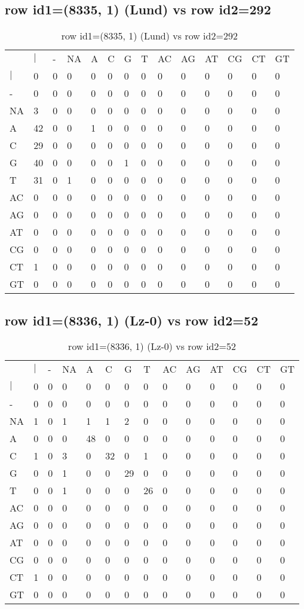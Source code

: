 \subsection{row id1=(8335, 1) (Lund) vs row id2=292}
\begin{center}
\begin{longtable}{|l|l|l|l|l|l|l|l|l|l|l|l|l|l|}
\caption{row id1=(8335, 1) (Lund) vs row id2=292} \label{table_dm532}\\
\hline
\\
\hline
&$|$&-&NA&A&C&G&T&AC&AG&AT&CG&CT&GT\\
$|$&0&0&0&0&0&0&0&0&0&0&0&0&0\\
-&0&0&0&0&0&0&0&0&0&0&0&0&0\\
NA&3&0&0&0&0&0&0&0&0&0&0&0&0\\
A&42&0&0&1&0&0&0&0&0&0&0&0&0\\
C&29&0&0&0&0&0&0&0&0&0&0&0&0\\
G&40&0&0&0&0&1&0&0&0&0&0&0&0\\
T&31&0&1&0&0&0&0&0&0&0&0&0&0\\
AC&0&0&0&0&0&0&0&0&0&0&0&0&0\\
AG&0&0&0&0&0&0&0&0&0&0&0&0&0\\
AT&0&0&0&0&0&0&0&0&0&0&0&0&0\\
CG&0&0&0&0&0&0&0&0&0&0&0&0&0\\
CT&1&0&0&0&0&0&0&0&0&0&0&0&0\\
GT&0&0&0&0&0&0&0&0&0&0&0&0&0\\
\hline
\end{longtable}
\end{center}

\subsection{row id1=(8336, 1) (Lz-0) vs row id2=52}
\begin{center}
\begin{longtable}{|l|l|l|l|l|l|l|l|l|l|l|l|l|l|}
\caption{row id1=(8336, 1) (Lz-0) vs row id2=52} \label{table_dm534}\\
\hline
\\
\hline
&$|$&-&NA&A&C&G&T&AC&AG&AT&CG&CT&GT\\
$|$&0&0&0&0&0&0&0&0&0&0&0&0&0\\
-&0&0&0&0&0&0&0&0&0&0&0&0&0\\
NA&1&0&1&1&1&2&0&0&0&0&0&0&0\\
A&0&0&0&48&0&0&0&0&0&0&0&0&0\\
C&1&0&3&0&32&0&1&0&0&0&0&0&0\\
G&0&0&1&0&0&29&0&0&0&0&0&0&0\\
T&0&0&1&0&0&0&26&0&0&0&0&0&0\\
AC&0&0&0&0&0&0&0&0&0&0&0&0&0\\
AG&0&0&0&0&0&0&0&0&0&0&0&0&0\\
AT&0&0&0&0&0&0&0&0&0&0&0&0&0\\
CG&0&0&0&0&0&0&0&0&0&0&0&0&0\\
CT&1&0&0&0&0&0&0&0&0&0&0&0&0\\
GT&0&0&0&0&0&0&0&0&0&0&0&0&0\\
\hline
\end{longtable}
\end{center}

